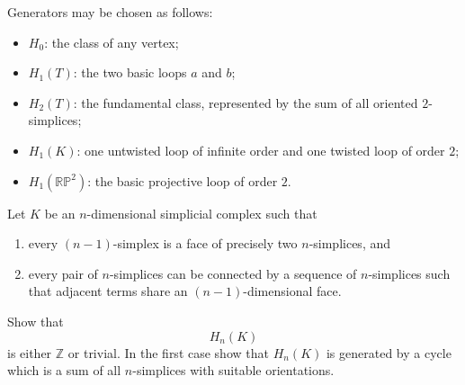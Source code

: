 \begin{solution}
Generators may be chosen as follows:

\begin{itemize}
	\item \(H_0\): the class of any vertex;
	\item \(H_1(T)\): the two basic loops \(a\) and \(b\);
	\item \(H_2(T)\): the fundamental class, represented by the sum of all oriented \(2\)-simplices;
	\item \(H_1(K)\): one untwisted loop of infinite order and one twisted loop of order \(2\);
	\item \(H_1(\mathbb{RP}^2)\): the basic projective loop of order \(2\).
\end{itemize}

\par
\end{solution}

\begin{problem}
Let \(K\) be an \(n\)-dimensional simplicial complex such that

\begin{enumerate}
	\item[(i)] every \((n-1)\)-simplex is a face of precisely two \(n\)-simplices, and
	\item[(ii)] every pair of \(n\)-simplices can be connected by a sequence of \(n\)-simplices such that adjacent terms share an \((n-1)\)-dimensional face.
\end{enumerate}

Show that
\[
H_n(K)
\]
is either \(\mathbb Z\) or trivial. In the first case show that \(H_n(K)\) is generated by a cycle which is a sum of all \(n\)-simplices with suitable orientations.
\end{problem}

